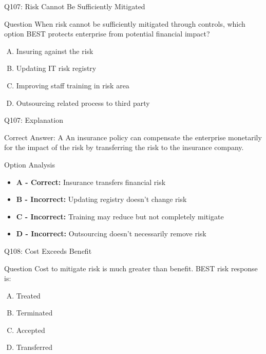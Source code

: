 \documentclass{beamer}
\begin{document}
	\begin{frame}{Q107: Risk Cannot Be Sufficiently Mitigated}
		\begin{block}{Question}
			When risk cannot be sufficiently mitigated through controls, which option BEST protects enterprise from potential financial impact?
		\end{block}
		\begin{enumerate}[(A)]
			\item Insuring against the risk
			\item Updating IT risk registry
			\item Improving staff training in risk area
			\item Outsourcing related process to third party
		\end{enumerate}
	\end{frame}
	
	\begin{frame}{Q107: Explanation}
		\begin{block}{Correct Answer: A}
			An insurance policy can compensate the enterprise monetarily for the impact of the risk by transferring the risk to the insurance company.
		\end{block}
		\begin{block}{Option Analysis}
			\begin{itemize}
				\item \textbf{A - Correct:} Insurance transfers financial risk
				\item \textbf{B - Incorrect:} Updating registry doesn't change risk
				\item \textbf{C - Incorrect:} Training may reduce but not completely mitigate
				\item \textbf{D - Incorrect:} Outsourcing doesn't necessarily remove risk
			\end{itemize}
		\end{block}
	\end{frame}
	
	\begin{frame}{Q108: Cost Exceeds Benefit}
		\begin{block}{Question}
			Cost to mitigate risk is much greater than benefit. BEST risk response is:
		\end{block}
		\begin{enumerate}[(A)]
			\item Treated
			\item Terminated
			\item Accepted
			\item Transferred
		\end{enumerate}
	\end{frame}
	
\end{document}
